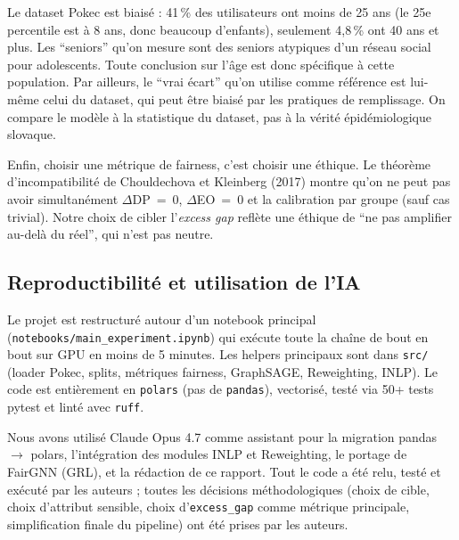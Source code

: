 \documentclass[10pt,a4paper,twocolumn]{article}
\begin{document}
Le dataset Pokec est biaisé : 41\,\% des utilisateurs ont moins de 25 ans (le 25e percentile est à 8 ans, donc beaucoup d'enfants), seulement 4{,}8\,\% ont 40 ans et plus. Les ``seniors'' qu'on mesure sont des seniors atypiques d'un réseau social pour adolescents. Toute conclusion sur l'âge est donc spécifique à cette population. Par ailleurs, le ``vrai écart'' qu'on utilise comme référence est lui-même celui du dataset, qui peut être biaisé par les pratiques de remplissage. On compare le modèle à la statistique du dataset, pas à la vérité épidémiologique slovaque.

Enfin, choisir une métrique de fairness, c'est choisir une éthique. Le théorème d'incompatibilité de Chouldechova et Kleinberg (2017) montre qu'on ne peut pas avoir simultanément $\Delta$DP~=~0, $\Delta$EO~=~0 et la calibration par groupe (sauf cas trivial). Notre choix de cibler l'\emph{excess gap} reflète une éthique de ``ne pas amplifier au-delà du réel'', qui n'est pas neutre.

\subsection{Reproductibilité et utilisation de l'IA}

Le projet est restructuré autour d'un notebook principal (\texttt{notebooks/main\_experiment.ipynb}) qui exécute toute la chaîne de bout en bout sur GPU en moins de 5 minutes. Les helpers principaux sont dans \texttt{src/} (loader Pokec, splits, métriques fairness, GraphSAGE, Reweighting, INLP). Le code est entièrement en \texttt{polars} (pas de \texttt{pandas}), vectorisé, testé via 50+ tests pytest et linté avec \texttt{ruff}.

Nous avons utilisé Claude Opus 4.7 comme assistant pour la migration pandas $\rightarrow$ polars, l'intégration des modules INLP et Reweighting, le portage de FairGNN (GRL), et la rédaction de ce rapport. Tout le code a été relu, testé et exécuté par les auteurs ; toutes les décisions méthodologiques (choix de cible, choix d'attribut sensible, choix d'\texttt{excess\_gap} comme métrique principale, simplification finale du pipeline) ont été prises par les auteurs.
\end{document}
